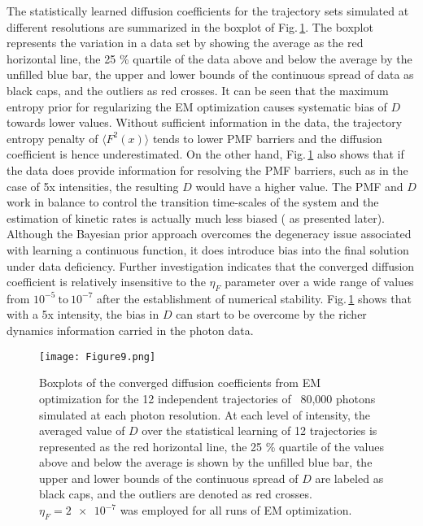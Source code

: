 \documentclass[journal=jpcbfk,manuscript=article,layout=twocolumn,articletitle=true]{achemso}
\begin{document}
The statistically learned diffusion coefficients for the trajectory sets simulated at different resolutions are summarized in the boxplot of Fig.\,\ref{fig:Ds}. The boxplot represents the variation in a data set by showing the average as the red horizontal line, the 25 \% quartile of the data above and below the average by the unfilled blue bar, the upper and lower bounds of the continuous spread of data as black caps, and the outliers as red crosses. It can be seen that the maximum entropy prior for regularizing the EM optimization causes systematic bias of $D$ towards lower values. Without sufficient information in the data, the trajectory entropy penalty of $\langle F^2(x) \rangle$ tends to lower PMF barriers and the diffusion coefficient is hence underestimated. On the other hand, Fig.\,\ref{fig:Ds} also shows that if the data does provide information for resolving the PMF barriers, such as in the case of 5x intensities, the resulting $D$ would have a higher value. The PMF and $D$ work in balance to control the transition time-scales of the system and the estimation of kinetic rates is actually much less biased ( as presented later). Although the Bayesian prior approach overcomes the degeneracy issue associated with learning a continuous function, it does introduce bias into the final solution under data deficiency.\cite{FIRTH:1993hg} Further investigation indicates that the converged diffusion coefficient is relatively insensitive to the $\eta_F$ parameter over a wide range of values from $10^{-5} ~\text{to}~10^{-7}$ after the establishment of numerical stability. Fig.\,\ref{fig:Ds} shows that with a 5x intensity, the bias in $D$ can start to be overcome by the richer dynamics information carried in the photon data.

\begin{figure}[htbp]
\centering
\texttt{[image: Figure9.png]}
\caption[Optimized diffusion constant from smFRET]{\label{fig:Ds} Boxplots of the converged diffusion coefficients from EM optimization for the 12 independent trajectories of ~80,000 photons simulated at each photon resolution. At each level of intensity, the averaged value of $D$ over the statistical learning of 12 trajectories is represented as the red horizontal line, the 25 \% quartile of the values above and below the average is shown by the unfilled blue bar, the upper and lower bounds of the continuous spread of  $D$ are labeled as black caps, and the outliers are denoted as red crosses. $\eta_F = \num{2e-7}$ was employed for all runs of EM optimization.}
\end{figure} 
\end{document}
